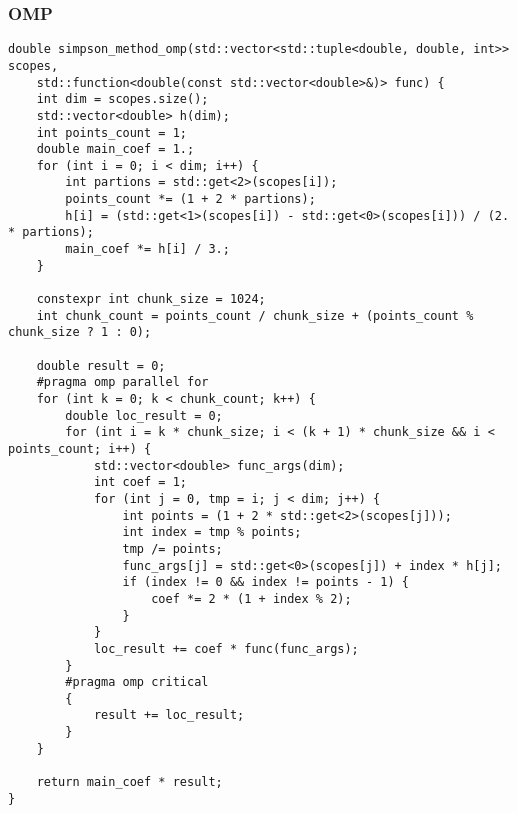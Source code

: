 \documentclass[14pt, a4paper]{extarticle}
\begin{document}
  \subsubsection{OMP}
  \begin{lstlisting}
double simpson_method_omp(std::vector<std::tuple<double, double, int>> scopes,
    std::function<double(const std::vector<double>&)> func) {
    int dim = scopes.size();
    std::vector<double> h(dim);
    int points_count = 1;
    double main_coef = 1.;
    for (int i = 0; i < dim; i++) {
        int partions = std::get<2>(scopes[i]);
        points_count *= (1 + 2 * partions);
        h[i] = (std::get<1>(scopes[i]) - std::get<0>(scopes[i])) / (2. * partions);
        main_coef *= h[i] / 3.;
    }

    constexpr int chunk_size = 1024;
    int chunk_count = points_count / chunk_size + (points_count % chunk_size ? 1 : 0);

    double result = 0;
    #pragma omp parallel for
    for (int k = 0; k < chunk_count; k++) {
        double loc_result = 0;
        for (int i = k * chunk_size; i < (k + 1) * chunk_size && i < points_count; i++) {
            std::vector<double> func_args(dim);
            int coef = 1;
            for (int j = 0, tmp = i; j < dim; j++) {
                int points = (1 + 2 * std::get<2>(scopes[j]));
                int index = tmp % points;
                tmp /= points;
                func_args[j] = std::get<0>(scopes[j]) + index * h[j];
                if (index != 0 && index != points - 1) {
                    coef *= 2 * (1 + index % 2);
                }
            }
            loc_result += coef * func(func_args);
        }
        #pragma omp critical
        {
            result += loc_result;
        }
    }

    return main_coef * result;
}
  \end{lstlisting}
  \newpage
\end{document}
